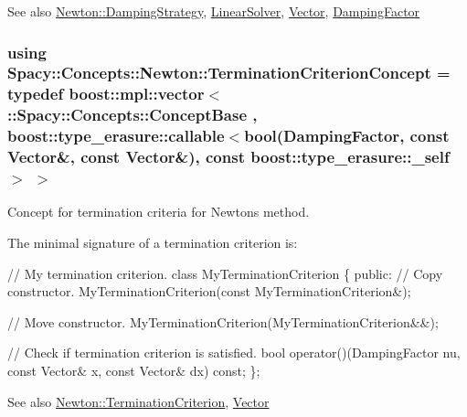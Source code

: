 \begin{DoxySeeAlso}{See also}
\hyperlink{namespaceSpacy_1_1Newton_ae2ba8821b209bfac2ab9190e6283cf06_Newton_DampingStrategyAnchor}{Newton\+:\+:Damping\+Strategy}, \hyperlink{namespaceSpacy_a7d5cd1c6fb9dd85aa345b536caf30bba_LinearSolverAnchor}{Linear\+Solver}, \hyperlink{group__SpacyGroup_gafc144d2730ef87a67e54f8cd750b1f54_VectorAnchor}{Vector}, \hyperlink{classSpacy_1_1DampingFactor}{Damping\+Factor} 
\end{DoxySeeAlso}
\hypertarget{group__NewtonConceptGroup_ga7d7604bea8b7c261d3179a7e95ffbe76_ga7d7604bea8b7c261d3179a7e95ffbe76}{}
\subsubsection[{Termination\+Criterion\+Concept}]{\setlength{\rightskip}{0pt plus 5cm}using {\bf Spacy\+::\+Concepts\+::\+Newton\+::\+Termination\+Criterion\+Concept} = typedef boost\+::mpl\+::vector$<$ \+::{\bf Spacy\+::\+Concepts\+::\+Concept\+Base} , boost\+::type\+\_\+erasure\+::callable$<$bool({\bf Damping\+Factor}, const {\bf Vector}\&, const {\bf Vector}\&), const boost\+::type\+\_\+erasure\+::\+\_\+self$>$ $>$}\label{group__NewtonConceptGroup_ga7d7604bea8b7c261d3179a7e95ffbe76_ga7d7604bea8b7c261d3179a7e95ffbe76}


Concept for termination criteria for Newton\textquotesingle{}s method. 

\label{group__NewtonConceptGroup_ga7d7604bea8b7c261d3179a7e95ffbe76_Newton_TerminationCriterionConceptAnchor}%
\hypertarget{group__NewtonConceptGroup_ga7d7604bea8b7c261d3179a7e95ffbe76_Newton_TerminationCriterionConceptAnchor}{}%
The minimal signature of a termination criterion is\+: 
\begin{DoxyCode}
\textcolor{comment}{// My termination criterion.}
\textcolor{keyword}{class }MyTerminationCriterion
\{
\textcolor{keyword}{public}:
  \textcolor{comment}{// Copy constructor.}
  MyTerminationCriterion(\textcolor{keyword}{const} MyTerminationCriterion&);

  \textcolor{comment}{// Move constructor.}
  MyTerminationCriterion(MyTerminationCriterion&&);

  \textcolor{comment}{// Check if termination criterion is satisfied.}
  \textcolor{keywordtype}{bool} operator()(DampingFactor nu, \textcolor{keyword}{const} Vector& x, \textcolor{keyword}{const} Vector& dx) \textcolor{keyword}{const};
\};
\end{DoxyCode}


\begin{DoxySeeAlso}{See also}
\hyperlink{namespaceSpacy_1_1Newton_abfa64b52531032d7a5fe6d0ec1a3cbd5_Newton_TerminationCriterionAnchor}{Newton\+:\+:Termination\+Criterion}, \hyperlink{group__SpacyGroup_gafc144d2730ef87a67e54f8cd750b1f54_VectorAnchor}{Vector} 
\end{DoxySeeAlso}
